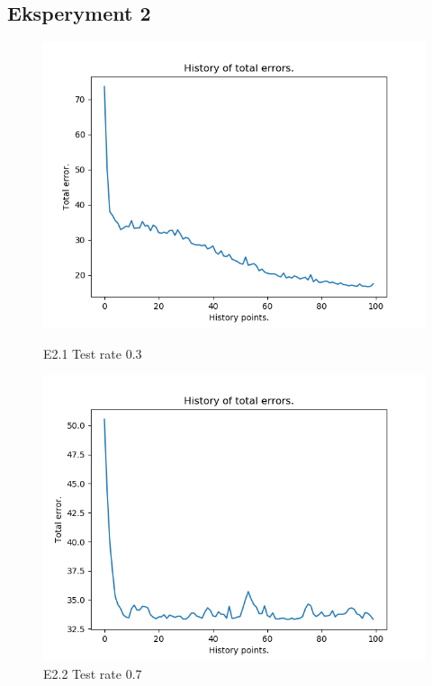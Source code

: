 \documentclass{classrep}
\begin{document}
	\subsection{Eksperyment 2}
		\begin{figure}[H]
			\begin{minipage}{0.5\linewidth}
				\centering
				\includegraphics[scale=0.25]{iris_nn_l2.png}
				\caption{E2.1 Test rate  0.3}
			\end{minipage}
			\begin{minipage}{0.5\linewidth}
				\centering
				\includegraphics[scale=0.25]{iris_nn_l4.png}
				\caption{E2.2 Test rate  0.7}
				\label{E2.2}
			\end{minipage}
			\begin{minipage}{0.5\linewidth}

\end{minipage}
\end{figure}
\end{document}
